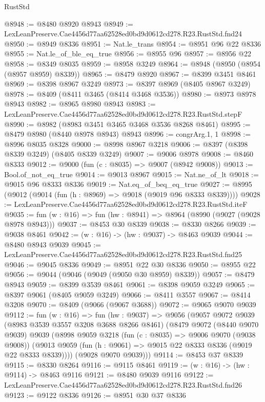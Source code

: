 \begin{lexlean}{RustStd}
\begin{coremodule}
@8948 := @8480 @8920 @8943
@8949 := LexLeanPreserve.Cae4456d77aa62528ed0bd9d0612cd278.R23.RustStd.fnd24
@8950 := @8949 @8336
@8951 := Nat.le_trans
@8954 := @8951 @96 @22 @8336
@8955 := Nat.le_of_ble_eq_true
@8956 := @8955 @96
@8957 := @8956 @22
@8958 := @8349 @8035
@8959 := @8958 @3249
@8964 := @8948 (@8950 (@8954 (@8957 @8959) @8339))
@8965 := @8479 @8920
@8967 := @8399 @3451 @8461
@8969 := @8398 @8967 @3249
@8973 := @8397 @8969 (@8405 @8967 @3249)
@8978 := @8409 (@8411 @3465 (@8414 @3468 @3536))
@8980 := @8973 @8978 @8943
@8982 := @8965 @8980 @8943
@8983 := LexLeanPreserve.Cae4456d77aa62528ed0bd9d0612cd278.R23.RustStd.stepF
@8990 := @8982 (@8983 @3451 @3465 @3468 @3536 @8268 @8461)
@8995 := @8479 @8980 (@8440 @8978 @8943) @8943
@8996 := congrArg.{1, 1}
@8998 := @8996 @8035 @8328
@9000 := @8998 @8967 @3218
@9006 := @8397 (@8398 @8339 @3249) (@8405 @8339 @3249)
@9007 := @9006 @8978
@9008 := @8460 @8333
@9012 := @9000 (fun (c : @8035) => @9007 (@8942 @9008))
@9013 := Bool.of_not_eq_true
@9014 := @9013 @8967
@9015 := Nat.ne_of_lt
@9018 := @9015 @96 @8333 @8336
@9019 := Nat.eq_of_beq_eq_true
@9027 := @8995 (@9012 (@9014 (fun (h : @8969) => @9018 (@9019 @96 @8333 @8339))))
@9028 := LexLeanPreserve.Cae4456d77aa62528ed0bd9d0612cd278.R23.RustStd.iteF
@9035 := fun (w : @16) => fun (hw : @8941) => @8964 (@8990 (@9027 (@9028 @8978 @8943)))
@9037 := @8453 @30 @8339
@9038 := @8330 @8266
@9039 := @9038 @8461
@9042 := (w : @16) -> (hw : @9037) -> @8463 @9039
@9044 := @8480 @8943 @9039
@9045 := LexLeanPreserve.Cae4456d77aa62528ed0bd9d0612cd278.R23.RustStd.fnd25
@9046 := @9045 @8336
@9049 := @8951 @22 @30 @8336
@9050 := @8955 @22
@9056 := @9044 (@9046 (@9049 (@9050 @30 @8959) @8339))
@9057 := @8479 @8943
@9059 := @8399 @3539 @8461
@9061 := @8398 @9059 @3249
@9065 := @8397 @9061 (@8405 @9059 @3249)
@9066 := @8411 @3557
@9067 := @8414 @3208
@9070 := @8409 (@9066 (@9067 @3688))
@9072 := @9065 @9070 @9039
@9112 := fun (w : @16) =>
  fun (hw : @9037) =>
  @9056
    (@9057
      @9072
      @9039
      (@8983 @3539 @3557 @3208 @3688 @8266 @8461)
      (@8479
        @9072
        (@8440 @9070 @9039)
        @9039
        (@8998
          @9059
          @3218
          (fun (c : @8035) => @9006 @9070 (@9038 @9008))
          (@9013 @9059 (fun (h : @9061) => @9015 @22 @8333 @8336 (@9019 @22 @8333 @8339))))
        (@9028 @9070 @9039)))
@9114 := @8453 @37 @8339
@9115 := @8330 @8264
@9116 := @9115 @8461
@9119 := (w : @16) -> (hw : @9114) -> @8463 @9116
@9121 := @8480 @9039 @9116
@9122 := LexLeanPreserve.Cae4456d77aa62528ed0bd9d0612cd278.R23.RustStd.fnd26
@9123 := @9122 @8336
@9126 := @8951 @30 @37 @8336

\end{coremodule}
\end{lexlean}
